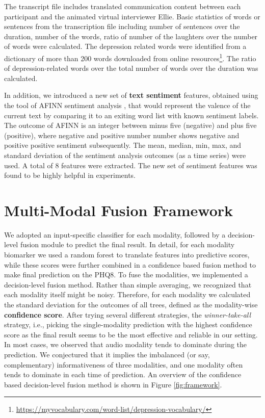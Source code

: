 \documentclass[letterpaper]{article} %
\begin{document}
The transcript file includes translated communication content between each participant and the animated virtual interviewer Ellie. Basic statistics of words or sentences from the transcription file including number of sentences over the duration, number of the words, ratio of number of the laughters over the number of words were calculated. The depression related words were identified from a dictionary of more than 200 words downloaded from online resources\footnote{\url{https://myvocabulary.com/word-list/depression-vocabulary/}}. The ratio of depression-related words over the total number of words over the duration was calculated.

In addition, we introduced a new set of \textbf{text sentiment} features, obtained using the tool of AFINN sentiment analysis \cite{nielsen2011new}, that would represent the valence of the current text by comparing it to an exiting word list with known sentiment labels. The outcome of AFINN is an integer between minus five (negative) and plus five (positive), where negative and positive number number shows negative and positive positive sentiment subsequently. The mean, median, min, max, and standard deviation of the sentiment analysis outcomes (as a time series) were used. A total of 8 features were extracted. The new set of sentiment features was found to be highly helpful in experiments.

\section{Multi-Modal Fusion Framework}

We adopted an input-specific classifier for each modality, followed by a decision-level fusion module to predict the final result. In detail, for each modality biomarker we used a random forest to translate features into predictive scores, while these scores were further combined in a confidence based fusion method to make final prediction on the PHQ8. To fuse the modalities, we implemented a decision-level fusion method. Rather than simple averaging, we recognized that each modality itself might be noisy. Therefore, for each modality we calculated the standard deviation for the outcomes of all trees, defined as the modality-wise \textbf{confidence score}. After trying several different strategies, the \textit{winner-take-all} strategy, i.e., picking the single-modality prediction with the highest confidence score as the final result seems to be the most effective and reliable in our setting. In most cases, we observed that audio modality tends to dominate during the prediction. We conjectured that it implies the imbalanced (or say, complementary) informativeness of three modalities, and one modality often tends to dominate in each time of prediction. An overview of the confidence based decision-level fusion method is shown in Figure \ref{fig:framework}.
\end{document}
